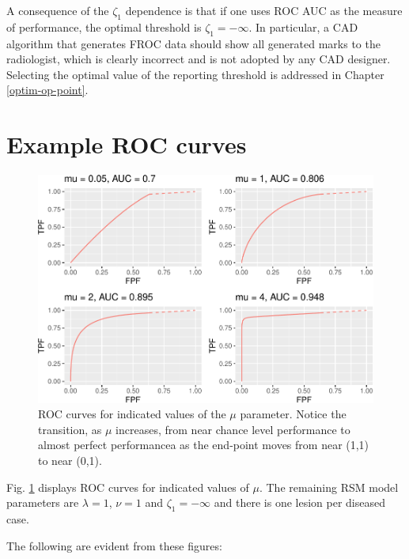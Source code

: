 \documentclass[
]{book}
\begin{document}
A consequence of the \(\zeta_1\) dependence is that if one uses ROC AUC as the measure of performance, the optimal threshold is \(\zeta_1 = -\infty\). In particular, a CAD algorithm that generates FROC data should show all generated marks to the radiologist, which is clearly incorrect and is not adopted by any CAD designer. Selecting the optimal value of the reporting threshold is addressed in Chapter \ref{optim-op-point}.

\hypertarget{rsm-pred-roc-curves}{%
\section{Example ROC curves}\label{rsm-pred-roc-curves}}

\begin{figure}
\centering
\includegraphics{07-rsm-predictions_files/figure-latex/rsm-pred-fig-auc-mu-plots-1.pdf}
\caption{\label{fig:rsm-pred-fig-auc-mu-plots}ROC curves for indicated values of the \(\mu\) parameter. Notice the transition, as \(\mu\) increases, from near chance level performance to almost perfect performancea as the end-point moves from near (1,1) to near (0,1).}
\end{figure}

Fig. \ref{fig:rsm-pred-fig-auc-mu-plots} displays ROC curves for indicated values of \(\mu\). The remaining RSM model parameters are \(\lambda = 1\), \(\nu = 1\) and \(\zeta_1 = -\infty\) and there is one lesion per diseased case.

The following are evident from these figures:
\end{document}
